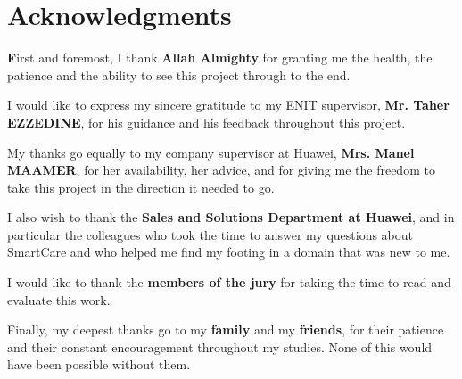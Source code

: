 \section*{Acknowledgments}

\vspace{1cm}

\par \textbf{F}irst and foremost, I thank \textbf{Allah Almighty} for granting
me the health, the patience and the ability to see this project through to the
end.

I would like to express my sincere gratitude to my ENIT supervisor,
\textbf{Mr. Taher EZZEDINE}, for his guidance and his feedback throughout this
project.

My thanks go equally to my company supervisor at Huawei,
\textbf{Mrs. Manel MAAMER}, for her availability, her advice, and for giving me
the freedom to take this project in the direction it needed to go.

I also wish to thank the \textbf{Sales and Solutions Department at Huawei}, and
in particular the colleagues who took the time to answer my questions about
SmartCare and who helped me find my footing in a domain that was new to me.

I would like to thank the \textbf{members of the jury} for taking the time to
read and evaluate this work.

Finally, my deepest thanks go to my \textbf{family} and my \textbf{friends}, for
their patience and their constant encouragement throughout my studies. None of
this would have been possible without them.
